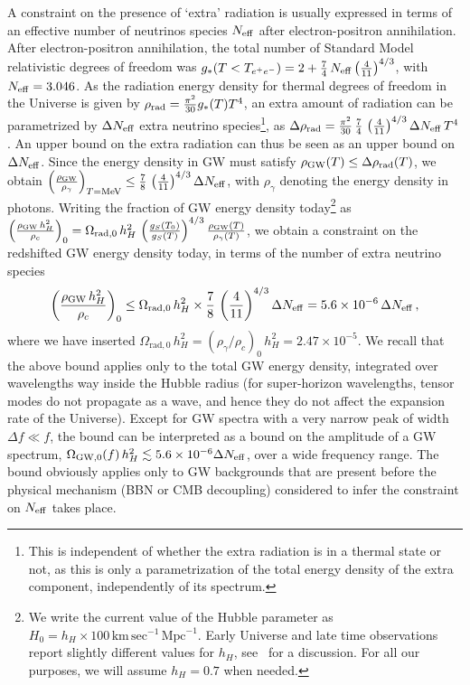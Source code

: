 \documentclass[11pt,a4paper]{article}
\begin{document}
A constraint on the presence of `extra' radiation is usually expressed in terms of an effective number of neutrinos species $N_{\rm eff}$ after electron-positron annihilation. After electron-positron annihilation, the total number of Standard Model relativistic degrees of freedom was $g_*(T < T_{e^+e^-}) = 2 + \frac{7}{4}\,N_{\rm eff} \left(\frac{4}{11}\right)^{4/3}$, with $N_{\rm eff}=3.046$. As the radiation energy density for thermal degrees of freedom in the Universe is given by $\rho_{\rm rad} = \frac{\pi^2}{30}g_{*}(T)T^4$, an extra amount of radiation can be parametrized by $\Delta N_{\rm eff}$ extra neutrino species\footnote{This is independent of whether the extra radiation is in a thermal state or not, as this is only a parametrization of the total energy density of the extra component, independently of its spectrum.}, as $\Delta \rho_\mathrm{rad} =  \frac{\pi^2}{30}\, \frac{7}{4}\, \left(\frac{4}{11}\right)^{4/3} \Delta N_{\rm eff} \, T^4$. An upper bound on the extra radiation can thus be seen as an upper bound on $\Delta N_{\rm eff}$. Since the energy density in GW must satisfy $\rho_{\rm GW}(T) \leq \Delta \rho_\mathrm{rad}(T)$, we obtain $\left(\frac{\rho_\mathrm{GW}}{\rho_{\gamma}}\right)_{T = \mathrm{MeV}} \leq \frac{7}{8}\, \left(\frac{4}{11}\right)^{4/3} \Delta N_{\rm eff}$, with $\rho_\gamma$ denoting the energy density in photons. Writing the fraction of GW energy density today\footnote{{We write the current value of the Hubble parameter as $H_0 = h_H \times 100 \, \text{km} \, \text{sec}^{-1} \, \text{Mpc}^{-1}$. Early Universe and late time observations report slightly different values for $h_H$, see~\cite{Bernal:2016gxb} for a discussion. For all our purposes, we will assume $h_H = 0.7$ when needed.}} as $\left(\frac{\rho_{\rm GW} \, h_H^2}{\rho_c}\right)_0 = \Omega_{\text{rad},0} \, h_H^2 \, \left(\frac{g_S(T_0)}{g_S(T)}\right)^{4/3}\frac{\rho_{\rm GW}(T)}{\rho_\gamma(T)}$, we obtain a constraint on the redshifted GW energy density today, in terms of the number of extra neutrino species~\cite{Caprini:2018mtu}
\begin{eqnarray}
\label{eq:ConsRhoBBN}
\left(\frac{\rho_{\rm GW} \, h_H^2}{\rho_c}\right)_0 \leq  \Omega_{\text{rad},0} \, h_H^2 \times \frac{7}{8}\, \left(\frac{4}{11}\right)^{4/3} \Delta N_{\rm eff}= 5.6 \times 10^{-6} \,
\Delta N_{\rm eff}\,,
\end{eqnarray}
where we have inserted $\Omega_{\text{rad},0} \, h_H^2 = \left(\rho_{\gamma}/\rho_c\right)_0 \, h_H^2 = 2.47 \times 10^{-5}$.
We recall that the above bound applies only to the total GW energy density, integrated over wavelengths way inside the Hubble radius (for super-horizon wavelengths, tensor modes do not propagate as a wave, and hence they do not affect the expansion rate of the Universe). Except for GW spectra with a very narrow peak of width $\Delta f \ll f$, the bound can be interpreted as a bound on the amplitude of a GW spectrum, $\Omega_{\text{GW},0}(f) \, h_H^2 \lesssim 5.6 \times 10^{-6} \Delta N_{\rm eff}$, over a wide frequency range.  The bound obviously applies only to GW backgrounds that are present before the physical mechanism (BBN or CMB decoupling) considered to infer the constraint on $N_{\rm eff}$ takes place.
\end{document}
